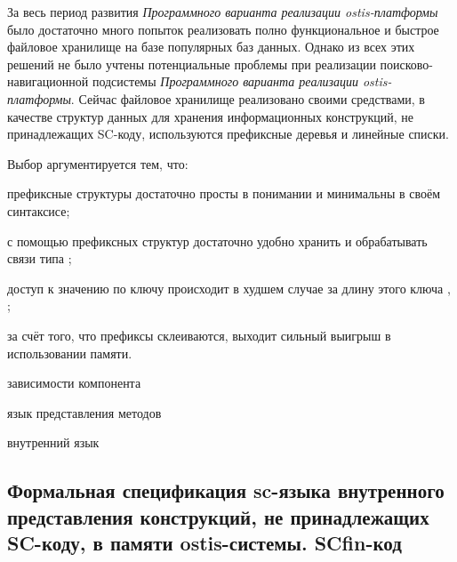 За весь период развития \textit{Программного варианта реализации ostis-платформы} было достаточно много попыток реализовать полно функциональное и быстрое файловое хранилище на базе популярных баз данных. Однако из всех этих решений не было учтены потенциальные проблемы при реализации поисково-навигационной подсистемы \textit{Программного варианта реализации ostis-платформы}. Сейчас файловое хранилище реализовано своими средствами, в качестве структур данных для хранения информационных конструкций, не принадлежащих SC-коду, используются префиксные деревья  и линейные списки.

Выбор аргументируется тем, что:
\begin{textitemize}
    \item префиксные структуры достаточно просты в понимании и минимальны в своём синтаксисе;
    \item с помощью префиксных структур достаточно удобно хранить и обрабатывать связи типа ;
    \item доступ к значению по ключу происходит в худшем случае за длину этого ключа \cite{tsuruta2022cPrefixTree}, ;
    \item за счёт того, что префиксы склеиваются, выходит сильный выигрыш в использовании памяти.
\end{textitemize}

\begin{SCn}
\begin{scnrelfromset}{зависимости компонента}
\end{scnrelfromset}
\begin{scnrelfromlist}{язык представления методов}
\end{scnrelfromlist}
\begin{scnrelfromlist}{внутренний язык}
\end{scnrelfromlist}
\end{SCn}

\subsection{Формальная спецификация sc-языка внутренного представления конструкций, не принадлежащих SC-коду, в памяти ostis-системы. SCfin-код}
\label{sec_soft_platform_scfin_code}

